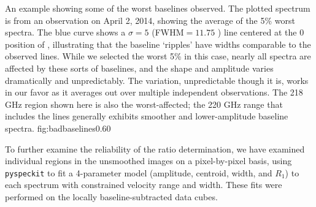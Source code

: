{An example showing some of the worst baselines observed.  The plotted spectrum
is from an observation on April 2, 2014, showing the average of the 5\% worst
spectra.  The blue curve shows a $\sigma=5$ \kms (FWHM$=11.75$ \kms) line centered
at the 0 \kms position of \para \threeohthree,
illustrating that the baseline `ripples' have widths comparable to the observed
lines.  While we selected the worst 5\% in this case, nearly all spectra are
affected by these sorts of baselines, and the shape and amplitude varies
dramatically and unpredictably.  The variation, unpredictable though it is,
works in our favor as it averages out over multiple independent observations.
The 218 GHz region shown here is also the worst-affected; the 220 GHz range
that includes the \thirteenco lines generally exhibits smoother and
lower-amplitude baseline spectra.}
{fig:badbaselines}{0.6}{0}


To further examine the reliability of the ratio determination, we have examined
individual regions in the unsmoothed images on a pixel-by-pixel basis, using
\texttt{pyspeckit} to fit a 4-parameter model (amplitude, centroid, width, and
$R_1$) to each spectrum with constrained velocity range and width.  These fits
were performed on the locally baseline-subtracted data cubes.






